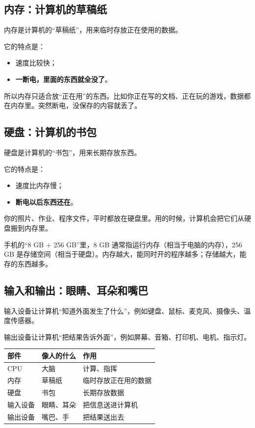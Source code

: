\subsection{内存：计算机的草稿纸}

内存是计算机的“草稿纸”，用来临时存放正在使用的数据。

它的特点是：

\begin{itemize}
  \item 速度比较快；
  \item \textbf{一断电，里面的东西就全没了}。
\end{itemize}

所以内存只适合放“正在用”的东西。比如你正在写的文档、正在玩的游戏，数据都在内存里。突然断电，没保存的内容就丢了。

\subsection{硬盘：计算机的书包}

硬盘是计算机的“书包”，用来长期存放东西。

它的特点是：

\begin{itemize}
  \item 速度比内存慢；
  \item \textbf{断电以后东西还在}。
\end{itemize}

你的照片、作业、程序文件，平时都放在硬盘里。用的时候，计算机会把它们从硬盘搬到内存里。

\begin{tipbox}[手机也是一样的]
手机的“8 GB + 256 GB”里，8 GB 通常指运行内存（相当于电脑的内存），256 GB 是存储空间（相当于硬盘）。内存越大，能同时开的程序越多；存储越大，能存的东西越多。
\end{tipbox}

\subsection{输入和输出：眼睛、耳朵和嘴巴}

输入设备让计算机“知道外面发生了什么”，例如键盘、鼠标、麦克风、摄像头、温度传感器。

输出设备让计算机“把结果告诉外面”，例如屏幕、音箱、打印机、电机、指示灯。

\begin{center}
\begin{tabular}{@{}lll@{}}
\toprule
部件 & 像人的什么 & 作用 \\
\midrule
CPU & 大脑 & 计算、指挥 \\
内存 & 草稿纸 & 临时存放正在用的数据 \\
硬盘 & 书包 & 长期存放数据 \\
输入设备 & 眼睛、耳朵 & 把信息送进计算机 \\
输出设备 & 嘴巴、手 & 把结果送出去 \\
\bottomrule
\end{tabular}
\end{center}

